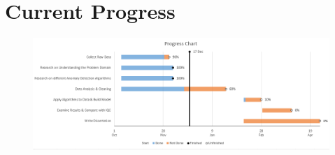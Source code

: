 \documentclass[12pt, twoside]{report}
\begin{document}
	\section{Current Progress}
	\begin{figure}[H]
		\centering
		\includegraphics[width=\linewidth]{GnattChart}
		\label{fig:GnattChart}
	\end{figure}
	
\end{document}
